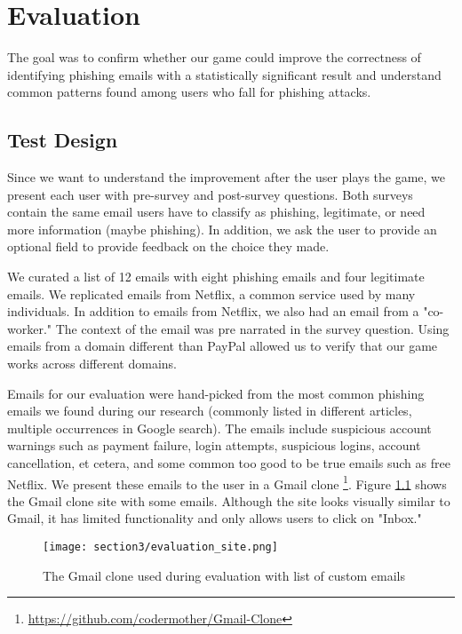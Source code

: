 



\chapter{Evaluation}

The goal was to confirm whether our game could improve the correctness of identifying phishing emails with a statistically significant result and understand common patterns found among users who fall for phishing attacks.

\section{Test Design}
Since we want to understand the improvement after the user plays the game, we present each user with pre-survey and post-survey questions. Both surveys contain the same email users have to classify as phishing, legitimate, or need more information (maybe phishing). In addition, we ask the user to provide an optional field to provide feedback on the choice they made.

We curated a list of 12 emails with eight phishing emails and four legitimate emails. We replicated emails from Netflix, a common service used by many individuals. In addition to emails from Netflix, we also had an email from a "co-worker." The context of the email was pre narrated in the survey question. Using emails from a domain different than PayPal allowed us to verify that our game works across different domains.

Emails for our evaluation were hand-picked from the most common phishing emails we found during our research (commonly listed in different articles, multiple occurrences in Google search). The emails include suspicious account warnings such as payment failure, login attempts, suspicious logins, account cancellation, et cetera, and some common too good to be true emails such as free Netflix. We present these emails to the user in a Gmail clone \footnote{\url{https://github.com/codermother/Gmail-Clone}}. Figure \ref{fig:evaluation_site} shows the Gmail clone site with some emails. Although the site looks visually similar to Gmail, it has limited functionality and only allows users to click on "Inbox."

\begin{figure}[!ht]
    \texttt{[image: section3/evaluation\_site.png]}
    \caption{The Gmail clone used during evaluation with list of custom emails}
    \label{fig:evaluation_site}
\end{figure}

